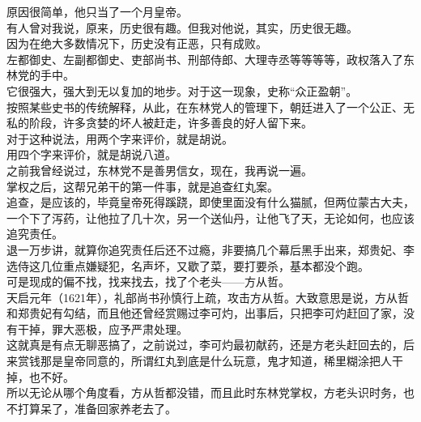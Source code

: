 \begin{multicols}{\theparacolNo}
原因很简单，他只当了一个月皇帝。\\

有人曾对我说，原来，历史很有趣。但我对他说，其实，历史很无趣。\\

因为在绝大多数情况下，历史没有正恶，只有成败。\\

左都御史、左副都御史、吏部尚书、刑部侍郎、大理寺丞等等等等，政权落入了东林党的手中。\\

它很强大，强大到无以复加的地步。对于这一现象，史称“众正盈朝”。\\

按照某些史书的传统解释，从此，在东林党人的管理下，朝廷进入了一个公正、无私的阶段，许多贪婪的坏人被赶走，许多善良的好人留下来。\\

对于这种说法，用两个字来评价，就是胡说。\\

用四个字来评价，就是胡说八道。\\

之前我曾经说过，东林党不是善男信女，现在，我再说一遍。\\

掌权之后，这帮兄弟干的第一件事，就是追查红丸案。\\

追查，是应该的，毕竟皇帝死得蹊跷，即使里面没有什么猫腻，但两位蒙古大夫，一个下了泻药，让他拉了几十次，另一个送仙丹，让他飞了天，无论如何，也应该追究责任。\\

退一万步讲，就算你追究责任后还不过瘾，非要搞几个幕后黑手出来，郑贵妃、李选侍这几位重点嫌疑犯，名声坏，又歇了菜，要打要杀，基本都没个跑。\\

可是现成的偏不找，找来找去，找了个老头——方从哲。\\

天启元年（1621年），礼部尚书孙慎行上疏，攻击方从哲。大致意思是说，方从哲和郑贵妃有勾结，而且他还曾经赏赐过李可灼，出事后，只把李可灼赶回了家，没有干掉，罪大恶极，应予严肃处理。\\

这就真是有点无聊恶搞了，之前说过，李可灼最初献药，还是方老头赶回去的，后来赏钱那是皇帝同意的，所谓红丸到底是什么玩意，鬼才知道，稀里糊涂把人干掉，也不好。\\

所以无论从哪个角度看，方从哲都没错，而且此时东林党掌权，方老头识时务，也不打算呆了，准备回家养老去了。\\


\end{multicols}
